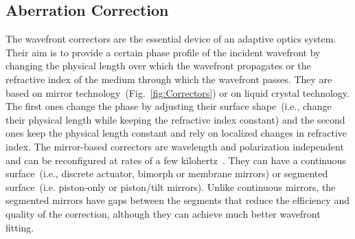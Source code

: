 \subsection{Aberration Correction}
\label{sec:AberrationCorrection}

The wavefront correctors are the essential device of an adaptive optics system. Their aim is to provide a certain phase profile of the incident wavefront by changing the physical length over which the wavefront propagates or the refractive index of the medium through which the wavefront passes. They are based on mirror technology~(Fig.~\ref{fig:Correctors}) or on liquid crystal technology. The first ones change the phase by adjusting their surface shape~(i.e., change their physical length while keeping the refractive index constant) and the second ones keep the physical length constant and rely on localized changes in refractive index. The mirror-based correctors are wavelength and polarization independent and can be reconfigured at rates of a few kilohertz~\cite{AOM_basic_ref}. They can have a continuous surface~(i.e., discrete actuator, bimorph or membrane mirrors) or segmented surface~(i.e. piston-only or piston/tilt mirrors). Unlike continuous mirrors, the segmented mirrors have gaps between the segments that reduce the efficiency and quality of the correction, although they can achieve much better wavefront fitting. 

